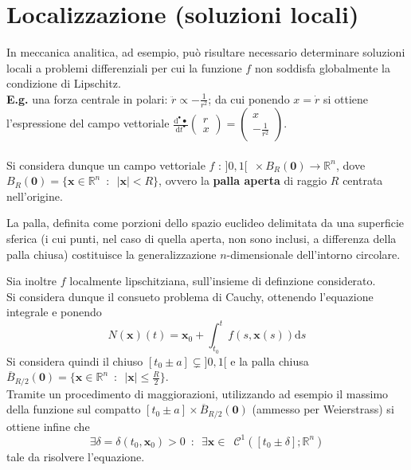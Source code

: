 \documentclass[10pt, oneside]{book}
\theoremstyle{plain}
\begin{document}
\section{Localizzazione (soluzioni locali)}
In meccanica analitica, ad esempio, può risultare necessario determinare soluzioni locali a problemi differenziali per cui la funzione $f$ non soddisfa globalmente la condizione di Lipschitz.
\\\textbf{E.g.} una forza centrale in polari: $\displaystyle \ddot r \propto - \frac{1}{r^2}$; da cui ponendo $x = \dot r$ si ottiene l'espressione del campo vettoriale $\displaystyle \frac{\textrm{d}^{•} •}{\textrm{d}t^{•}} \begin{pmatrix}
r\\ x
\end{pmatrix} = \begin{pmatrix}
x \\ - \frac{1}{r^2}
\end{pmatrix}$.
\\~\\Si considera dunque un campo vettoriale $f$ : $]0,1[ \enspace \times B_R(\mathbf{0}) \rightarrow \mathbb{R}^n$, dove $\displaystyle B_R(\mathbf{0}) = \{\mathbf{x} \in \mathbb{R}^n \enspace : \enspace |\mathbf{x}| < R\}$, ovvero la \textbf{palla aperta} di raggio $R$ centrata nell'origine. 
\begin{oss}
La palla, definita come porzioni dello spazio euclideo delimitata da una superficie sferica (i cui punti, nel caso di quella aperta, non sono inclusi, a differenza della palla chiusa) costituisce la generalizzazione $n$-dimensionale dell'intorno circolare.
\end{oss} 
Sia inoltre $f$ localmente lipschitziana, sull'insieme di definzione considerato.
\\Si considera dunque il consueto problema di Cauchy, ottenendo l'equazione integrale e ponendo
\[N(\mathbf{x})(t) = \mathbf{x}_0 + \int_{t_0}^tf(s, \mathbf{x}(s))\textrm{d}s\]
Si considera quindi il chiuso $[t_0 \pm a] \subsetneq ]0,1[$ e la palla chiusa $\displaystyle \overline{B}_{R/2}(\mathbf{0}) = \{\mathbf{x} \in \mathbb{R}^n \enspace : \enspace |\mathbf{x}| \leq \frac{R}{2}\}$.
\\Tramite un procedimento di maggiorazioni, utilizzando ad esempio il massimo della funzione sul compatto $[t_0 \pm a] \times \overline{B}_{R/2}(\mathbf{0})$ (ammesso per Weierstrass) si ottiene infine che
\[\exists \delta = \delta(t_0, \mathbf{x}_0) > 0 \enspace : \enspace \exists \mathbf{x} \in \enspace \mathcal{C}^{1}([t_0 \pm \delta] ; \mathbb{R}^n)\]
tale da risolvere l'equazione.
\end{document}
